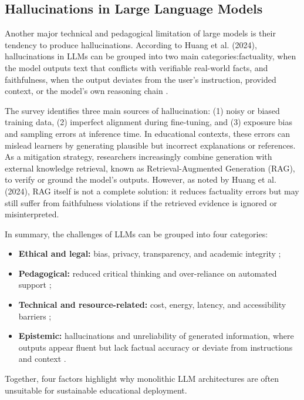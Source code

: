 \subsection{Hallucinations in Large Language Models}
Another major technical and pedagogical limitation of large models is their tendency to produce hallucinations. According to Huang et al. (2024), hallucinations in LLMs can be grouped into two main categories:factuality, when the model outputs text that conflicts with verifiable real-world facts, and faithfulness, when the output deviates from the user’s instruction, provided context, or the model’s own reasoning chain \parencite{Huang2024HallucinationSurvey}.  

The survey identifies three main sources of hallucination: (1) noisy or biased training data,  
(2) imperfect alignment during fine-tuning, and (3) exposure bias and sampling errors at inference time.  
In educational contexts, these errors can mislead learners by generating plausible but incorrect explanations or references. As a mitigation strategy, researchers increasingly combine generation with external knowledge retrieval, known as Retrieval-Augmented Generation (RAG), to verify or ground the model’s outputs. However, as noted by Huang et al. (2024), RAG itself is not a complete solution:  
it reduces factuality errors but may still suffer from faithfulness violations if the retrieved evidence is ignored or misinterpreted.

In summary, the challenges of LLMs can be grouped into four categories:
\begin{itemize}
    \item \textbf{Ethical and legal:} bias, privacy, transparency, and academic integrity \parencite{Practica79:online, Dataprot22:online, CodeofEt55:online};
    \item \textbf{Pedagogical:} reduced critical thinking and over-reliance on automated support \parencite{ChatGPTf63:online, Primeron58:online};
    \item \textbf{Technical and resource-related:} cost, energy, latency, and accessibility barriers \parencite{SmallLan73:online, LLMVsSLM66:online};
    \item \textbf{Epistemic:} hallucinations and unreliability of generated information, where outputs appear fluent but lack factual accuracy or deviate from instructions and context  
    \parencite{Huang2024HallucinationSurvey}.
\end{itemize}

Together, four factors highlight why monolithic LLM architectures are often unsuitable for sustainable educational deployment.

